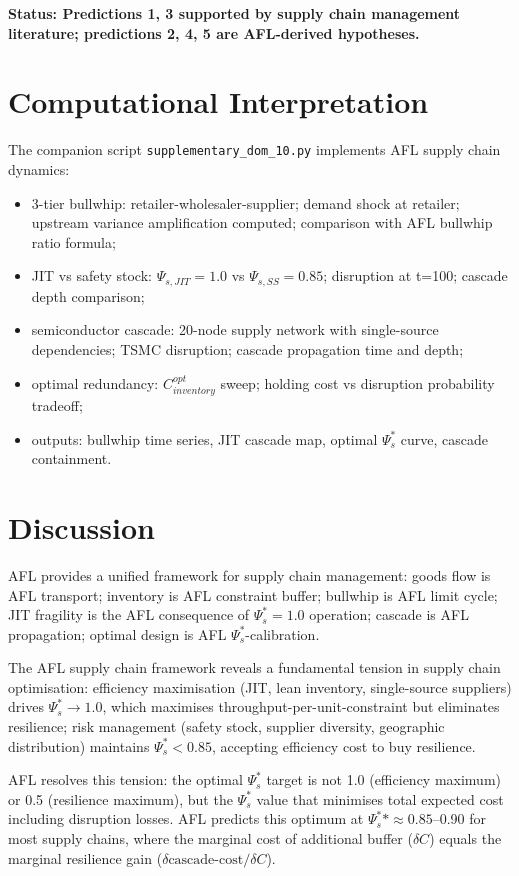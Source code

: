 \documentclass[11pt]{article}
\begin{document}
\textbf{Status: Predictions 1, 3 supported by supply chain management literature; predictions 2, 4, 5
are AFL-derived hypotheses.}

\section{Computational Interpretation}

The companion script \texttt{supplementary\_dom\_10.py} implements AFL supply chain dynamics:
\begin{itemize}
    \item 3-tier bullwhip: retailer-wholesaler-supplier; demand shock at retailer; upstream
          variance amplification computed; comparison with AFL bullwhip ratio formula;
    \item JIT vs safety stock: $\Psi_{s,JIT} = 1.0$ vs $\Psi_{s,SS} = 0.85$; disruption at t=100;
          cascade depth comparison;
    \item semiconductor cascade: 20-node supply network with single-source dependencies; TSMC
          disruption; cascade propagation time and depth;
    \item optimal redundancy: $C_{inventory}^{opt}$ sweep; holding cost vs disruption probability
          tradeoff;
    \item outputs: bullwhip time series, JIT cascade map, optimal $\Psi_s^*$ curve, cascade containment.
\end{itemize}

\section{Discussion}

AFL provides a unified framework for supply chain management: goods flow is AFL transport;
inventory is AFL constraint buffer; bullwhip is AFL limit cycle; JIT fragility is the AFL
consequence of $\Psi_s^* = 1.0$ operation; cascade is AFL propagation; optimal design is AFL
$\Psi_s^*$-calibration.

The AFL supply chain framework reveals a fundamental tension in supply chain optimisation:
efficiency maximisation (JIT, lean inventory, single-source suppliers) drives $\Psi_s^* \to 1.0$,
which maximises throughput-per-unit-constraint but eliminates resilience; risk management
(safety stock, supplier diversity, geographic distribution) maintains $\Psi_s^* < 0.85$, accepting
efficiency cost to buy resilience.

AFL resolves this tension: the optimal $\Psi_s^*$ target is not 1.0 (efficiency maximum) or 0.5
(resilience maximum), but the $\Psi_s^*$ value that minimises total expected cost including disruption
losses. AFL predicts this optimum at $\Psi_s^** \approx 0.85$--0.90 for most supply chains, where
the marginal cost of additional buffer ($\delta C$) equals the marginal resilience gain
($\delta \text{cascade-cost} / \delta C$).
\end{document}
